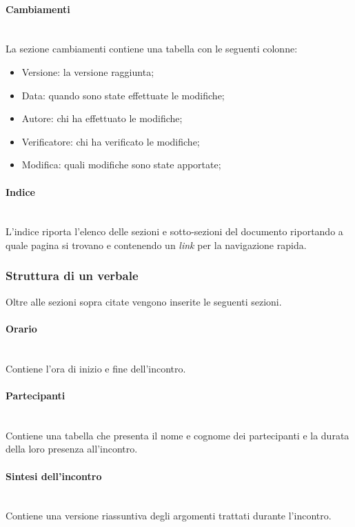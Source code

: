 \documentclass[5pt]{article}
\begin{document}
\paragraph{Cambiamenti}~\\
La sezione cambiamenti contiene una tabella con le seguenti colonne:
\begin{itemize}
    \item Versione: la versione raggiunta;
    \item Data: quando sono state effettuate le modifiche;
    \item Autore: chi ha effettuato le modifiche;
    \item Verificatore: chi ha verificato le modifiche;
    \item Modifica: quali modifiche sono state apportate;
\end{itemize}

\paragraph{Indice}~\\
L'indice riporta l'elenco delle sezioni e sotto-sezioni del documento riportando a quale pagina si trovano e contenendo un \textit{link} per la navigazione rapida.

\subsubsection{Struttura di un verbale}
Oltre alle sezioni sopra citate vengono inserite le seguenti sezioni.

\paragraph{Orario}~\\
Contiene l'ora di inizio e fine dell'incontro.

\paragraph{Partecipanti}~\\
Contiene una tabella che presenta il nome e cognome dei partecipanti e la durata della loro presenza all'incontro.

\paragraph{Sintesi dell'incontro}~\\
Contiene una versione riassuntiva degli argomenti trattati durante l'incontro.
\end{document}
